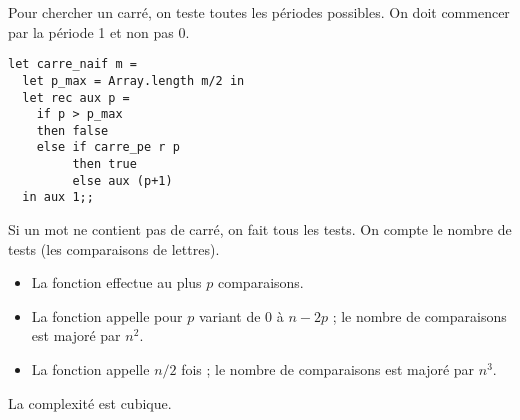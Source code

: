 \begin{Exercise} Pour chercher un carré, on teste toutes les périodes possibles. On doit commencer par la période 1 et non pas 0.
\begin{lstlisting}
let carre_naif m =
  let p_max = Array.length m/2 in
  let rec aux p =
    if p > p_max
    then false
    else if carre_pe r p
         then true
         else aux (p+1)
  in aux 1;;
\end{lstlisting}
\end{Exercise}
\begin{Exercise} Si un mot ne contient pas de carré, on fait tous les tests. On compte le nombre de tests (les comparaisons de lettres).

\begin{itemize}
  \item La fonction  effectue au plus $p$ comparaisons.
  \item La fonction  appelle  pour $p$ variant de 0 à $n-2p$ ; le nombre de comparaisons est majoré par $n^2$.
  \item La fonction  appelle  $n/2$ fois ; le nombre de comparaisons est majoré par $n^3$.
\end{itemize}
La complexité est cubique.
\end{Exercise}
\begin{Exercise}
\end{Exercise}
\begin{Exercise}
\end{Exercise}
\begin{Exercise}
\end{Exercise}
\begin{Exercise}
\end{Exercise}
\begin{Exercise}
\end{Exercise}
